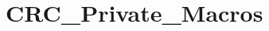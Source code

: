 \hypertarget{group___c_r_c___private___macros}{\section{C\-R\-C\-\_\-\-Private\-\_\-\-Macros}
\label{group___c_r_c___private___macros}
}
